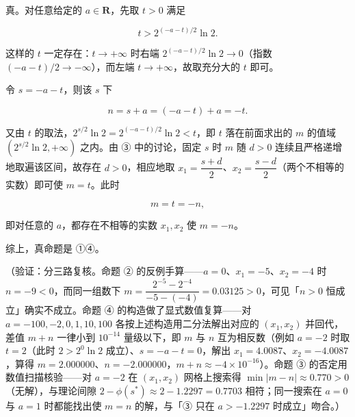 \begin{answer}

真。对任意给定的 \(a\in\mathbf{R}\)，先取 \(t>0\) 满足

\nopagebreak[4]
\[
t>2^{(-a-t)/2}\ln2.
\]

这样的 \(t\) 一定存在：\(t\to+\infty\) 时右端 \(2^{(-a-t)/2}\ln2\to0\)（指数 \((-a-t)/2\to-\infty\)），而左端 \(t\to+\infty\)，故取充分大的 \(t\) 即可。

令 \(s=-a-t\)，则该 \(s\) 下

\nopagebreak[4]
\[
n=s+a=(-a-t)+a=-t.
\]

又由 \(t\) 的取法，\(2^{s/2}\ln2=2^{(-a-t)/2}\ln2<t\)，即 \(t\) 落在前面求出的 \(m\) 的值域 \(\left(2^{s/2}\ln2,+\infty\right)\) 之内。由 ③ 中的讨论，固定 \(s\) 时 \(m\) 随 \(d>0\) 连续且严格递增地取遍该区间，故存在 \(d>0\)，相应地取 \(x_1=\dfrac{s+d}{2}\)、\(x_2=\dfrac{s-d}{2}\)（两个不相等的实数）即可使 \(m=t\)。此时

\nopagebreak[4]
\[
m=t=-n,
\]

即对任意的 \(a\)，都存在不相等的实数 \(x_1,x_2\) 使 \(m=-n\)。

综上，真命题是 ①④。

（验证：分三路复核。命题 ② 的反例手算——\(a=0\)、\(x_1=-5\)、\(x_2=-4\) 时 \(n=-9<0\)，而同一组数下 \(m=\dfrac{2^{-5}-2^{-4}}{-5-(-4)}=0.03125>0\)，可见「\(n>0\) 恒成立」确实不成立。命题 ④ 的构造做了显式数值复算——对 \(a=-100,-2,0,1,10,100\) 各按上述构造用二分法解出对应的 \((x_1,x_2)\) 并回代，差值 \(m+n\) 一律小到 \(10^{-14}\) 量级以下，即 \(m\) 与 \(n\) 互为相反数（例如 \(a=-2\) 时取 \(t=2\)（此时 \(2>2^{0}\ln2\) 成立）、\(s=-a-t=0\)，解出 \(x_1=4.0087\)、\(x_2=-4.0087\)，算得 \(m=2.000000\)、\(n=-2.000000\)，\(m+n\approx-4\times10^{-16}\)）。命题 ③ 的否定用数值扫描核验——对 \(a=-2\) 在 \((x_1,x_2)\) 网格上搜索得 \(\min|m-n|\approx0.770>0\)（无解），与理论间隙 \(2-\phi(s^{*})\approx2-1.2297=0.7703\) 相符；同一搜索在 \(a=0\) 与 \(a=1\) 时都能找出使 \(m=n\) 的解，与「③ 只在 \(a>-1.2297\) 时成立」吻合。）


\end{answer}
